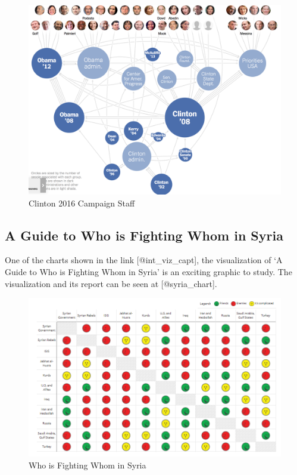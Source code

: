 \documentclass[]{book}
\theoremstyle{definition}
\theoremstyle{definition}
\theoremstyle{definition}
\theoremstyle{remark}
\begin{document}
\begin{figure}
\centering
\includegraphics{images/clinton_campaign.png}
\caption{Clinton 2016 Campaign Staff}
\end{figure}

\subsection{A Guide to Who is Fighting Whom in
Syria}\label{a-guide-to-who-is-fighting-whom-in-syria}

One of the charts shown in the link {[}@int\_viz\_capt{]}, the
visualization of `A Guide to Who is Fighting Whom in Syria' is an
exciting graphic to study. The visualization and its report can be seen
at {[}@syria\_chart{]}.

\begin{figure}
\centering
\includegraphics{images/img_syria_summary.PNG}
\caption{Who is Fighting Whom in Syria}
\end{figure}
\end{document}
